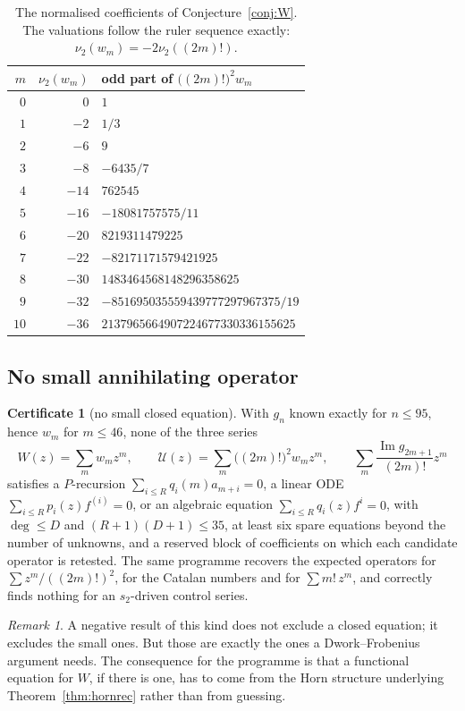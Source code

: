 \documentclass[12pt]{amsart}
\theoremstyle{definition}
\newtheorem{certificate}[theorem]{Certificate}
\theoremstyle{remark}
\newtheorem{remark}[theorem]{Remark}
\begin{document}
\begin{table}[t]
\centering
\small
\begin{tabular}{@{}rrl@{}}
\toprule
$m$ & $\nu_2(w_m)$ & odd part of $\bigl((2m)!\bigr)^2w_m$\\
\midrule
$0$ & $0$   & $1$\\
$1$ & $-2$  & $1/3$\\
$2$ & $-6$  & $9$\\
$3$ & $-8$  & $-6435/7$\\
$4$ & $-14$ & $762545$\\
$5$ & $-16$ & $-18081757575/11$\\
$6$ & $-20$ & $8219311479225$\\
$7$ & $-22$ & $-82171171579421925$\\
$8$ & $-30$ & $1483464568148296358625$\\
$9$ & $-32$ & $-851695035559439777297967375/19$\\
$10$& $-36$ & $2137965664907224677330336155625$\\
\bottomrule
\end{tabular}
\caption{The normalised coefficients of Conjecture~\ref{conj:W}.  The valuations follow the ruler sequence exactly:
$\nu_2(w_m)=-2\nu_2((2m)!)$.}
\label{tab:units}
\end{table}

\subsection{No small annihilating operator}

\begin{certificate}[no small closed equation]\label{cert:noeq}
With $g_n$ known exactly for $n\le95$, hence $w_m$ for $m\le46$, none of the three series
\[
  W(z)=\sum_mw_mz^m,\qquad   \mathcal U(z)=\sum_m\bigl((2m)!\bigr)^2w_mz^m,\qquad   \sum_m\frac{\operatorname{Im}g_{2m+1}}{(2m)!}z^m
\]
satisfies a $P$-recursion $\sum_{i\le R}q_i(m)a_{m+i}=0$, a linear ODE $\sum_{i\le R}p_i(z)f^{(i)}=0$, or an algebraic equation $\sum_{i\le R}q_i(z)f^i=0$, with $\deg\le D$ and $(R+1)(D+1)\le35$, at least six spare equations beyond the number of unknowns, and a reserved block of coefficients on which each candidate operator is retested.  The same programme recovers the expected operators for $\sum z^m/((2m)!)^2$, for the Catalan numbers and for $\sum m!\,z^m$, and correctly finds nothing for an $s_2$-driven control series.
\end{certificate}

\begin{remark}
A negative result of this kind does not exclude a closed equation; it excludes the small ones.  But those are exactly the ones a Dwork--Frobenius argument needs.  The consequence for the programme is that a functional equation for $W$, if there is one, has to come from the Horn structure underlying Theorem~\ref{thm:hornrec} rather than from guessing.
\end{remark}
\end{document}
